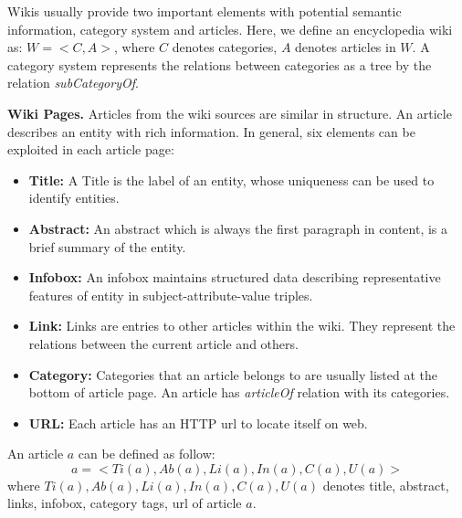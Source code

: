 \documentclass[runningheads,a4paper]{llncs}
\newcommand{\para}[1]{\vspace{0.1cm}\noindent\textbf{#1}}
\begin{document}
Wikis usually provide two important elements with potential semantic information, category system and articles. Here, we define an encyclopedia wiki as: $W = <C,A>$, where $C$ denotes categories, $A$ denotes articles in $W$. A category system represents the relations between categories as a tree by the relation \textit{subCategoryOf}. 

\para{Wiki Pages.} Articles from the wiki sources are similar in structure. An article describes an entity with rich information. In general, six elements can be exploited in each article page:
\begin{itemize}
  \item \textbf{Title:} A Title is the label of an entity, whose uniqueness can be used to identify entities.
  \item \textbf{Abstract:} An abstract which is always the first paragraph in content, is a brief summary of the entity.
  \item \textbf{Infobox:} An infobox maintains structured data describing representative features of entity in subject-attribute-value triples.
  \item \textbf{Link:} Links are entries to other articles within the wiki. They represent the relations between the current article and others.
  \item \textbf{Category:} Categories that an article belongs to are usually listed at the bottom of article page. An article has \textit{articleOf} relation with its categories.
  \item \textbf{URL:} Each article has an HTTP url to locate itself on web.
\end{itemize}

%
An article $a$ can be defined as follow:
\begin{displaymath}
    a = <Ti(a),Ab(a),Li(a),In(a),C(a),U(a)>
\end{displaymath}
where $Ti(a),Ab(a),Li(a),In(a),C(a),U(a)$ denotes title, abstract, links, infobox, category tags, url of article $a$.
\end{document}
